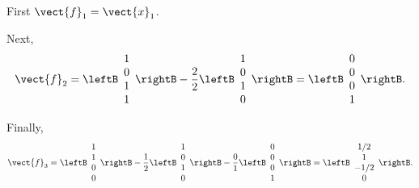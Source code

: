 \begin{solution}
First $\vect{f}_1=\vect{x}_1$. 

Next,
\[ \vect{f}_2=\leftB\begin{array}{c} 1\\ 0\\ 1\\ 1 \end{array}\rightB
-\frac{2}{2}\leftB\begin{array}{c} 1\\ 0\\ 1\\ 0 \end{array}\rightB
=\leftB\begin{array}{c} 0\\ 0\\ 0\\ 1 \end{array}\rightB.\]

Finally,
\[ \vect{f}_3=\leftB\begin{array}{c} 1\\ 1\\ 0\\ 0 \end{array}\rightB
-\frac{1}{2}\leftB\begin{array}{c} 1\\ 0\\ 1\\ 0 \end{array}\rightB
-\frac{0}{1}\leftB\begin{array}{c} 0\\ 0\\ 0\\ 1 \end{array}\rightB
=\leftB\begin{array}{c} 1/2\\ 1\\ -1/2\\ 0 \end{array}\rightB.\]


\end{solution}
